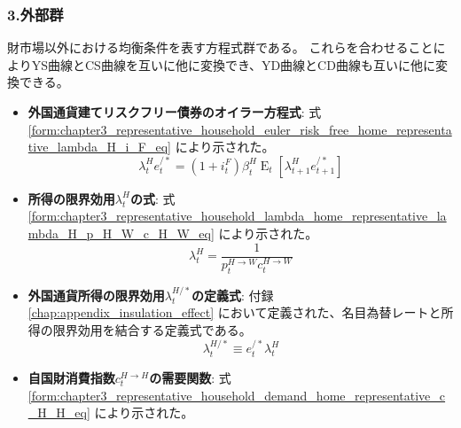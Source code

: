 \subsubsection*{3.外部群}
\label{sec:chapter5_two_plane_classification_connection}
財市場以外における均衡条件を表す方程式群である。
これらを合わせることによりYS曲線とCS曲線を互いに他に変換でき、YD曲線とCD曲線も互いに他に変換できる。
\begin{itemize}
    \item
    \label{itm:chapter5_two_plane_classification_external_euler}
        \textbf{外国通貨建てリスクフリー債券のオイラー方程式}:
        式
        \eqref{form:chapter3_representative_household_euler_risk_free_home_representative_lambda_H_i_F_eq}
        により示された。
        \begin{equation}
        \label{form:chapter5_two_plane_classification_external_lambda_H_i_F_eq}
            \lambda_t^H e_t^{/*}=(1+i_t^F)\beta_t^H\operatorname{E}_t[\lambda_{t+1}^H e_{t+1}^{/*}]
        \end{equation}
    \item
    \label{itm:chapter5_two_plane_classification_external_lambda}
        \textbf{所得の限界効用\(\lambda_t^H\)の式}:
        式
        \eqref{form:chapter3_representative_household_lambda_home_representative_lambda_H_p_H_W_c_H_W_eq}
        により示された。
        \begin{equation}
        \label{form:chapter5_two_plane_classification_external_lambda_H_p_H_W_c_H_W_eq}
            \lambda_t^H=\frac{1}{p_t^{H\to W}c_t^{H\to W}}
        \end{equation}
    \item
    \label{itm:chapter5_two_plane_classification_external_lambda_H_star_def}
        \textbf{外国通貨所得の限界効用\(\lambda_t^{H/*}\)の定義式}:
        付録
        \ref{chap:appendix_insulation_effect}
        において定義された、名目為替レートと所得の限界効用を結合する定義式である。
        \begin{equation}
        \label{form:chapter5_two_plane_classification_external_lambda_H_star_def_eq}
            \lambda_t^{H/*}\equiv e_t^{/*} \lambda_t^H
        \end{equation}
    \item
    \label{itm:chapter5_two_plane_classification_external_demand_home_goods}
        \textbf{自国財消費指数\(c_t^{H\to H}\)の需要関数}:
        式
        \eqref{form:chapter3_representative_household_demand_home_representative_c_H_H_eq}
        により示された。
        \begin{equation}

\end{equation}
\end{itemize}
